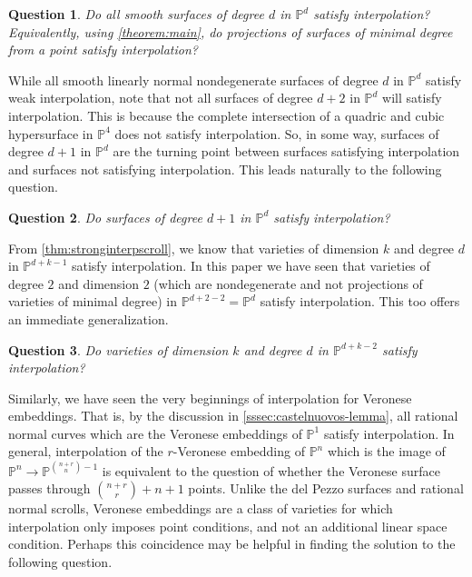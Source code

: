 \documentclass[reqno, 11pt]{amsart}
\newtheorem{question}{Question}
\theoremstyle{definition}
\theoremstyle{remark}
\numberwithin{equation}{section}
\numberwithin{thm}{section}
\numberwithin{prop}{section}
\numberwithin{lem}{section}
\numberwithin{cor}{section}
\numberwithin{conj}{section}
\numberwithin{defn}{section}
\theoremstyle{plain}
\theoremstyle{definition}
\newcommand\bp{{\mathbb P}}
\begin{document}
\begin{question}
	\label{question:}
	Do all smooth surfaces of degree $d$ in $\bp^d$ satisfy
	interpolation? Equivalently, using
	\cite[Theorem 2.5]{coskun:the-enumerative-geometry-of-del-Pezzo-surfaces-via-degenerations}
	\autoref{theorem:main},
			do projections of surfaces of minimal
	degree from a point 
	satisfy interpolation?
\end{question}

While all smooth linearly normal nondegenerate surfaces of degree $d$ in $\bp^d$
satisfy weak interpolation, note that not all surfaces of degree $d+2$
in $\bp^d$ will satisfy interpolation.
This is because the complete
intersection of a quadric and cubic hypersurface in $\bp^4$ does not
satisfy interpolation.
So, in some way, surfaces of degree $d + 1$ in $\bp^d$
are the turning point between surfaces satisfying interpolation
and surfaces not satisfying interpolation.
This leads naturally to the following question.

\begin{question}
	\label{question:}
	Do surfaces of degree $d + 1$ in $\bp^d$ satisfy interpolation?
\end{question}

From \autoref{thm:stronginterpscroll}, we know that varieties of dimension
$k$ and degree $d$ in $\bp^{d+k-1}$ satisfy interpolation.
In this paper we have seen that varieties of degree $2$ and
dimension $2$ (which are nondegenerate and not projections
of varieties of minimal degree)
in
$\bp^{d + 2 - 2} = \bp^d$ satisfy interpolation.
This too  offers an immediate generalization.

\begin{question}
	\label{question:}
	Do varieties of dimension $k$ and degree $d$ in
	$\bp^{d+k-2}$ satisfy interpolation?
\end{question}

Similarly, we have seen the very beginnings of interpolation
for Veronese embeddings. That is, by the discussion in
\ref{sssec:castelnuovos-lemma},
all rational normal curves which are the Veronese embeddings
of $\bp^1$ satisfy interpolation. In general, interpolation
of the $r$-Veronese embedding of $\bp^n$ which is the image of
$\bp^n \rightarrow \bp^{\binom{n+r}{n}-1}$ is equivalent
to the question of whether the Veronese surface
passes through $\binom{n+r}{r} + n +1$ points.
Unlike the del Pezzo surfaces and rational normal scrolls,
Veronese embeddings are a class of varieties for
which interpolation only imposes point conditions, and not
an additional linear space condition. Perhaps
this coincidence may be helpful in finding the solution to
the following question.
\end{document}
